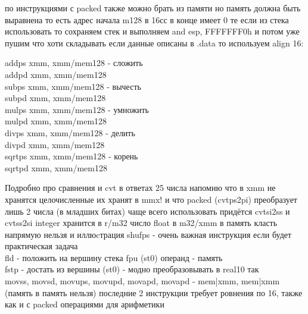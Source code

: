 \documentclass[a4paper,10pt]{article}
\begin{document}
по инструкциями с packed также можно брать из памяти но память должна быть выравнена то есть адрес начала m128 в 16сс в конце имеет 0 те если из стека использовать то сохраняем стек и выполняем and esp, FFFFFFF0h и потом уже пушим что хоти складывать если данные описаны в .data то используем align 16: \\
\begin{multicols}{2}
    \noindent
    addps xmm, xmm/mem128 - сложить \\
    addpd xmm, xmm/mem128  \\
    subps xmm, xmm/mem128 - вычесть \\
    subpd xmm, xmm/mem128 \\
    mulps xmm, xmm/mem128 - умножить \\
    mulpd xmm, xmm/mem128 \\
    divps xmm, xmm/mem128 - делить \\
    divpd xmm, xmm/mem128 \\
    sqrtps xmm, xmm/mem128 - корень \\
    sqrtpd xmm, xmm/mem128 \\
\end{multicols}

Подробно про сравнения и cvt в ответах 25 числа напомню что в xmm не хранятся целочисленные их хранят в mmx! и что packed (cvtps2pi) преобразует лишь 2 числа (в младших битах) чаще всего использовать придётся cvtsi2ss и cvtss2si integer хранится в r/m32 число float в m32/xmm в память класть напрямую нельзя и иллюcтрация shufps - очень важная инструкция если будет практическая задача\\
fld - положить на вершину стека fpu (st0) операнд - память \\
fstp - достать из вершины (st0) - модно преобразовывать в real10 так\\
movss, movsd, movups, movupd, movapd, movapd - mem|xmm, mem|xmm (память в память нельзя) последние 2 инструкции требует ровнения по 16, также как и с packed операциями для арифметики \\
\end{document}
